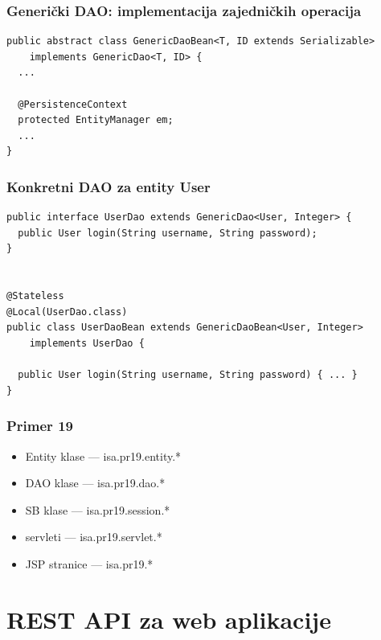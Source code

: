 \documentclass[compress]{beamer}
\begin{document}
\begin{frame}[fragile,shrink=10]
  \frametitle{Generički DAO: implementacija zajedničkih operacija}
\begin{verbatim}
public abstract class GenericDaoBean<T, ID extends Serializable> 
    implements GenericDao<T, ID> {
  ...
  
  @PersistenceContext
  protected EntityManager em;
  ...
}
\end{verbatim}
\end{frame}
\begin{frame}[fragile,shrink=10]
  \frametitle{Konkretni DAO za entity User}
\begin{verbatim}
public interface UserDao extends GenericDao<User, Integer> {
  public User login(String username, String password);
}


@Stateless
@Local(UserDao.class)
public class UserDaoBean extends GenericDaoBean<User, Integer> 
    implements UserDao {

  public User login(String username, String password) { ... }
}
\end{verbatim}
\end{frame}
\begin{frame}
  \frametitle{Primer 19}
  \begin{itemize}
    \item Entity klase --- isa.pr19.entity.*
    \item DAO klase --- isa.pr19.dao.*
    \item SB klase --- isa.pr19.session.*
    \item servleti --- isa.pr19.servlet.*
    \item JSP stranice --- isa.pr19.*
  \end{itemize}
\end{frame}

\section[REST]{REST API za web aplikacije}
\end{document}
